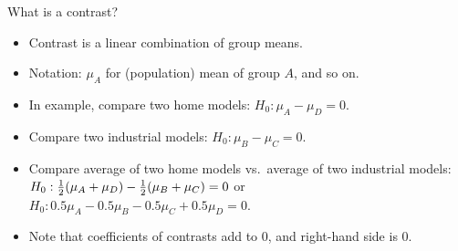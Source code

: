 \documentclass[
  ignorenonframetext,
]{beamer}
\begin{document}
\begin{frame}{What is a contrast?}
\protect\hypertarget{what-is-a-contrast}{}

\begin{itemize}
\item
  Contrast is a linear combination of group means.
\item
  Notation: \(\mu_A\) for (population) mean of group \(A\), and so on.
\item
  In example, compare two home models: \(H_0: \mu_A-\mu_D=0\).
\item
  Compare two industrial models: \(H_0: \mu_B-\mu_C=0\).
\item
  Compare average of two home models vs.~average of two industrial
  models: \(H_0: \frac{1}{2}(\mu_A+\mu_D)-{1\over 2}(\mu_B+\mu_C)=0\) or
  \(H_0: 0.5\mu_A-0.5\mu_B-0.5\mu_C+0.5\mu_D=0\).
\item
  Note that coefficients of contrasts add to 0, and right-hand side is
  0.
\end{itemize}

\end{frame}
\end{document}
